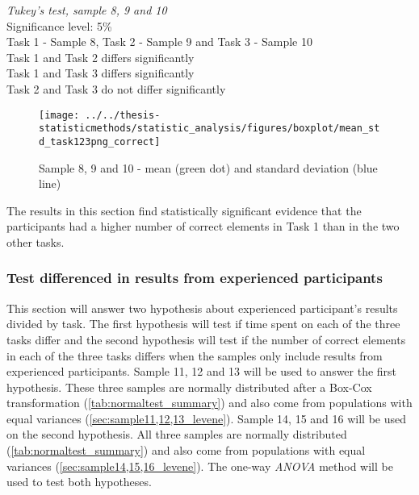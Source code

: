  \begin{center}
	\begin{tcolorbox}[width=0.8\textwidth]
		\centering
		\textit{Tukey's test, sample 8, 9 and 10}\\
		Significance level: 5\%  \\[0.5cm]
		Task 1 - Sample 8, Task 2 - Sample 9 and Task 3 - Sample 10 \\[0.5cm]
		
		Task 1 and Task 2 differs significantly \\
		Task 1 and Task 3 differs significantly \\
		Task 2 and Task 3 do not differ significantly \\[0.2cm]
	\end{tcolorbox} 
\end{center}

\begin{figure}[H]
	\centering
	\texttt{[image: ../../thesis-statisticmethods/statistic\_analysis/figures/boxplot/mean\_std\_task123png\_correct]}
	\caption{Sample 8, 9 and 10 - mean (green dot) and standard deviation (blue line)}
	\label{fig:meanstdtask123pngcorrect}
\end{figure}

\vspace{0.3cm}

The results in this section find statistically significant evidence that the participants had a higher number of correct elements in Task 1 than in the two other tasks. 

\subsubsection[Sample 11 - 16]{Test differenced in results from experienced participants}\label{sec:sample_11_12_13_anova}
This section will answer two hypothesis about experienced participant's results divided by task. The first hypothesis will test if time spent on each of the three tasks differ and the second hypothesis will test if the number of correct elements in each of the three tasks differs when the samples only include results from experienced participants. Sample 11, 12 and 13 will be used to answer the first hypothesis. These three samples are normally distributed after a Box-Cox transformation (\ref{tab:normaltest_summary}) and also come from populations with equal variances (\ref{sec:sample11,12,13_levene}). Sample 14, 15 and 16 will be used on the second hypothesis. All three samples are normally distributed (\ref{tab:normaltest_summary}) and also come from populations with equal variances (\ref{sec:sample14,15,16_levene}). The one-way \textit{ANOVA} method will be used to test both hypotheses. 

